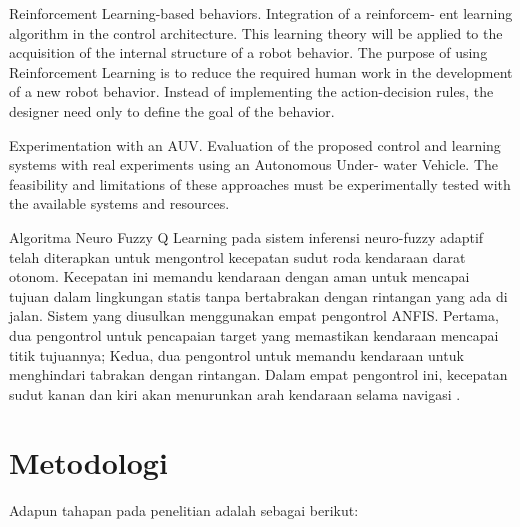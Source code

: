 Reinforcement Learning-based behaviors. Integration of a reinforcem- ent learning algorithm in the control architecture. This learning theory will be applied to the acquisition of the internal structure of a robot behavior. The purpose of using Reinforcement Learning is to reduce the required human work in the development of a new robot behavior. Instead of implementing the action-decision rules, the designer need only to define the goal of the behavior.

Experimentation with an AUV. Evaluation of the proposed control and learning systems with real experiments using an Autonomous Under- water Vehicle. The feasibility and limitations of these approaches must be experimentally tested with the available systems and resources.


Algoritma Neuro Fuzzy Q Learning pada sistem inferensi neuro-fuzzy adaptif telah diterapkan untuk mengontrol kecepatan sudut roda kendaraan darat otonom. Kecepatan ini memandu kendaraan dengan aman untuk mencapai tujuan dalam lingkungan statis tanpa bertabrakan dengan rintangan yang ada di jalan. Sistem yang diusulkan menggunakan empat pengontrol ANFIS. Pertama, dua pengontrol untuk pencapaian target yang memastikan kendaraan mencapai titik tujuannya; Kedua, dua pengontrol untuk memandu kendaraan untuk menghindari tabrakan dengan rintangan. Dalam empat pengontrol ini, kecepatan sudut kanan dan kiri akan menurunkan arah kendaraan selama navigasi \cite{Al-mayyahi2014}.
      

%



\section{Metodologi}

Adapun tahapan pada penelitian adalah sebagai berikut:

